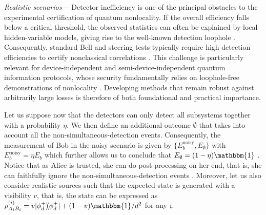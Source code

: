 \documentclass[pra,twocolumn,showpacs]{revtex4-2}
\newcommand{\ket}[1]{|#1\rangle}
\newcommand{\bra}[1]{\langle#1|}
\newcommand{\proj}[1]{\ket{#1}\!\!\bra{#1}}
\newcommand{\I}{\mathbbm{1}}
\theoremstyle{plain}
\theoremstyle{definition}
\theoremstyle{remark}
\begin{document}
{\it{Realistic scenarios---}} 
Detector inefficiency is one of the principal obstacles to the experimental certification of quantum nonlocality. %
If the overall efficiency falls below a critical threshold, the observed statistics can often be explained by local hidden-variable models, giving rise to the well-known detection loophole \cite{Pearle1970, Garg1987}. Consequently, standard Bell and steering tests typically require high detection efficiencies to certify nonclassical correlations \cite{CH, Branciard2012, Bennet2012}. This challenge is particularly relevant for device-independent and semi-device-independent quantum information protocols, whose security fundamentally relies on loophole-free demonstrations of nonlocality \cite{Acin2007, Brunner2014}. Developing methods that remain robust against arbitrarily large losses is therefore of both foundational and practical importance.

Let us suppose now that the detectors can only detect all subsystems together with a probability $\eta$. We then define an additional outcome $\emptyset$ that takes into account all the non-simultaneous-detection events. Consequently, the measurement of Bob in the noisy scenario is given by $ \{E_b^{\mathrm{noisy}},E_{\emptyset}\}$ with $  E_b^{\mathrm{noisy}}=\eta E_b$ which further allows us to conclude that $E_{\emptyset}=(1-\eta)\I$ \cite{NonlocalityReview}. Notice that as Alice is trusted, she can do post-processing on her end, that is, she can faithfully ignore the non-simultaneous-detection events \cite{Srivastav_2022, Masini}. Moreover, let us also consider realistic sources such that the expected state is generated with a visibility $v$, that is, the state can be expressed as $\rho^{(i)}_{A_iB_i}=v\proj{\phi^+_d}+(1-v)\I/d^2$ for any $i$.
\end{document}
